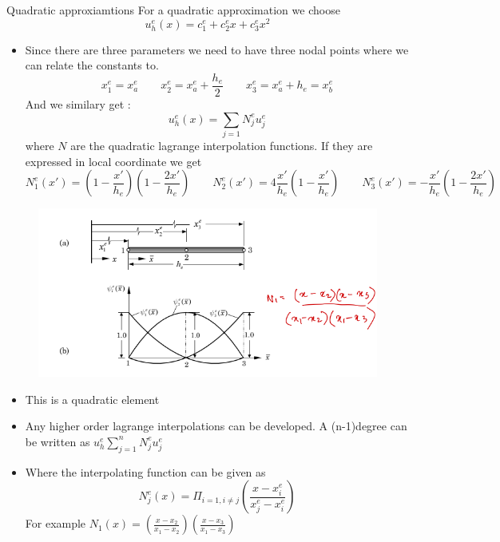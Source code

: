 	\begin{frame}{Quadratic approxiamtions}
		For a quadratic approximation we choose
		\begin{equation}
			u_h^e(x) =  c_1^e + c_2^ex + c_3^ex^2
		\end{equation}
		\begin{itemize}
			\item Since there are three parameters we need to have three nodal points where we can relate the constants to. 
			\begin{equation}
				x_1^e =  x_a^e \qquad x_2^e =  x_a^e + \frac{h_e}{2} \qquad x_3^e = x_a^e + h_e = x_b^e
			\end{equation}
			And we similary get :
			\begin{equation}
				u_h^e(x) = \sum_{j=1} N^e_ju_j^e
			\end{equation}
			where $N$ are the quadratic lagrange interpolation functions. If they are expressed in local coordinate we get
			\begin{equation}
				N_1^e(x') = \left(1-\frac{x'}{h_e} \right)\left(1-\frac{2x'}{h_e} \right) \qquad N_2^e(x') =4\frac{x'}{h_e}\left(1-\frac{x'}{h_e} \right) \qquad N_3^e(x') = -\frac{x'}{h_e}\left(1-\frac{2x'}{h_e} \right) 
			\end{equation}
		\end{itemize}
	\end{frame}

	\begin{frame}
		\begin{figure}
			\centering
			\includegraphics[width=0.7\linewidth]{Figure/fig4} 
		\end{figure}
		\begin{itemize}
			\item This is a quadratic element
			\item Any higher order lagrange interpolations can be developed. A (n-1)degree can be written as $u_h^e \sum_{j=1}^{n} N_j^eu_j^e$
			\item Where the interpolating function can be given as
			\begin{equation}
				N_j^e(x) = { \Pi_{i=1,i\neq j}} \left( \frac{x-x_i^e}{x_j^e-x_i^e} \right)
			\end{equation}
			For example $N_1(x) = \left(\frac{x-x_2}{x_1-x_2} \right)\left(\frac{x-x_3}{x_1-x_3} \right)$
		\end{itemize}
	\end{frame}


